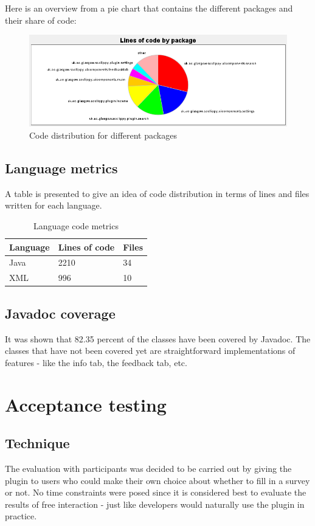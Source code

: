 \documentclass{l4proj}
\begin{document}
Here is an overview from a pie chart that contains the different packages and their share of code:

\begin{figure}[H]
\includegraphics[scale=0.6]{code-distribution}
\centering
\caption{Code distribution for different packages}
\label{fig:code-distribution}
\end{figure}

\subsection{Language metrics}
A table is presented to give an idea of code distribution in terms of lines and files written for each language.

\begin{table}[H]
\small
\caption{Language code metrics}
\centering
\def\arraystretch{1.5}
\begin{tabular}{p{2.5cm}p{2.5cm}p{2.5cm}}
\hline
Language & Lines of code & Files\\
\hline
Java & 2210 & 34\\
XML & 996 & 10\\
\hline
\end{tabular}
\label{table:language-codemetrics}
\end{table}

\subsection{Javadoc coverage}
It was shown that 82.35 percent of the classes have been covered by Javadoc. The classes that have not been covered yet are straightforward implementations of features - like the info tab, the feedback tab, etc. 

\section{Acceptance testing}

\subsection{Technique}
The evaluation with participants was decided to be carried out by giving the plugin to users who could make their own choice about whether to fill in a survey or not. No time constraints were posed since it is considered best to evaluate the results of free interaction - just like developers would naturally use the plugin in practice. 
\end{document}
